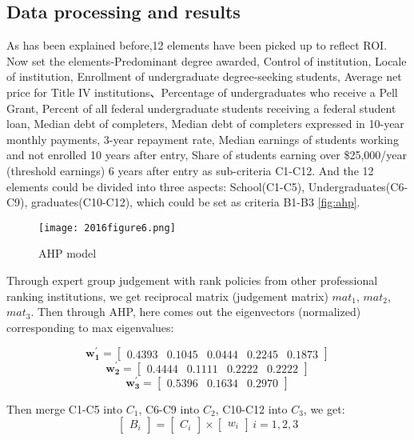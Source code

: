 \subsection{Data processing and results}

As has been explained before,12 elements have been picked up to reflect ROI. Now set the elements-Predominant degree awarded, Control of institution, Locale of institution, Enrollment of undergraduate degree-seeking students, Average net price for Title IV institutions、Percentage of undergraduates who receive a Pell Grant, Percent of all federal undergraduate students receiving a federal student loan, Median debt of completers, Median debt of completers expressed in 10-year monthly payments, 3-year repayment rate, Median earnings of students working and not enrolled 10 years after entry, Share of students earning over \$25,000/year (threshold earnings) 6 years after entry as sub-criteria C1-C12. And the 12 elements could be divided into three aspects: School(C1-C5), Undergraduates(C6-C9), graduates(C10-C12), which could be set as criteria B1-B3 \autoref{fig:ahp}.

    \begin{figure}[h]
      \texttt{[image: 2016figure6.png]}
      \caption{AHP model}\label{fig:ahp}
    \end{figure}
Through expert group judgement with rank policies from other professional ranking institutions, we get reciprocal matrix (judgement matrix) $mat_1$, $mat_2$, $mat_3$. Then through AHP, here comes out the eigenvectors (normalized) corresponding to max eigenvalues:

\begin{equation}
	\boldsymbol{w_1^{'}} = \begin{bmatrix}
0.4393 & 0.1045 & 0.0444 & 0.2245 & 0.1873
\end{bmatrix}
\end{equation}
\begin{equation}
	\boldsymbol{w_2^{'}} = \begin{bmatrix}
0.4444 & 0.1111 & 0.2222 & 0.2222
\end{bmatrix}
\end{equation}
\begin{equation}
	\boldsymbol{w_3^{'}} = \begin{bmatrix}
0.5396 & 0.1634 & 0.2970
\end{bmatrix}
\end{equation}

Then merge C1-C5 into $C_1$, C6-C9 into $C_2$, C10-C12 into $C_3$, we get:
\begin{equation}
\begin{bmatrix}
B_i
\end{bmatrix} = \begin{bmatrix} C_i \end{bmatrix} \times \begin{bmatrix} w_i\end{bmatrix} \,i=1,2,3
\end{equation}

